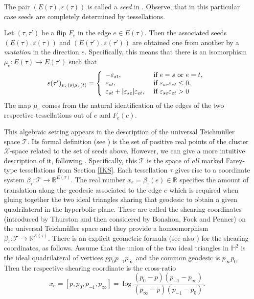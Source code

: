 \documentclass[twoside]{irmaems}
\theoremstyle{plain}
\theoremstyle{definition}
\theoremstyle{remark}
\newcommand{\R}{{\mathbb{R}}}
\begin{document}
\vspace{0.2cm}
\noindent 
The pair $(E(\tau), \varepsilon(\tau))$ is called a {\em seed} in \cite{FG}. 
Observe, that in this particular case seeds are completely determined by tessellations.

 \vspace{0.2cm}
\noindent 
Let $(\tau,\tau')$ be a flip $F_e$ in the edge $e\in E(\tau)$. Then the associated seeds 
$(E(\tau), \varepsilon(\tau))$  and  $(E(\tau'), \varepsilon(\tau'))$  
are obtained one from another by a {\em mutation} in the direction $e$.  
Specifically, this means that   
there is an isomorphism $\mu_e:E(\tau)\to E(\tau')$ such that 
\[ \varepsilon(\tau')_{\mu_e(s)\mu_e(t)}=\left\{
\begin{array}{ll}
-\varepsilon_{st}, & \mbox{ \rm if } e=s \mbox{ \rm or } e=t, \\
\varepsilon_{st}, & \mbox{ \rm if } \varepsilon_{se}\varepsilon_{et} \leq 0, \\
\varepsilon_{st} + |\varepsilon_{se}|\varepsilon_{et},   
& \mbox{ \rm if } \varepsilon_{se}\varepsilon_{et} >0 
\end{array}
\right. 
\]
The map $\mu_e$ comes from the natural identification of the edges  of the two 
respective tessellations out of $e$ and $F_e(e)$. 

\vspace{0.2cm}
\noindent 
This algebraic setting appears in the description of the universal Teichm\"uller space 
${\mathcal T}$.  Its formal definition (see \cite{FG1,FG2})  is the  set of positive real 
points  of the cluster ${\mathcal X}$-space related to the set of seeds above. However, 
we can give a more intuitive description of it, following \cite{pe0}.  
Specifically,  this ${\mathcal T}$ is the space of {\em all} marked 
Farey-type tessellations from Section \ref{IKS}. 
Each tessellation $\tau$ gives rise to a coordinate system 
$\beta_{\tau}:{\mathcal T}\to \R^{E(\tau)}$.  The real number  
$x_e=\beta_{\tau}(e)\in \R$ specifies the amount of translation along the geodesic associated 
to the edge $e$  which is required when gluing together the two ideal triangles sharing that geodesic 
to obtain a given quadrilateral in the hyperbolic plane.  
These are called the shearing coordinates (introduced by Thurston and then 
considered by Bonahon, Fock and Penner) on the universal Teichm\"uller space and they provide a 
homeomorphism $\beta_{\tau}:{\mathcal T}\to \R^{E(\tau)}$. 
There is an explicit geometric formula (see also \cite{Fo,Fun}) for the shearing coordinates, as follows. 
Assume that the union of the two ideal triangles in ${\mathbb H}^2$ is the ideal quadrilateral 
of vertices $pp_0p_{-1}p_{\infty}$ and the common geodesic is $p_{\infty}p_0$. 
Then the respective shearing coordinate is the cross-ratio 
\[ x_e=[p,p_0,p_{-1},p_{\infty}]=\log\frac{(p_0-p)(p_{-1}-p_{\infty})}
{(p_{\infty}-p)(p_{-1}-p_0)}.\]
\end{document}
